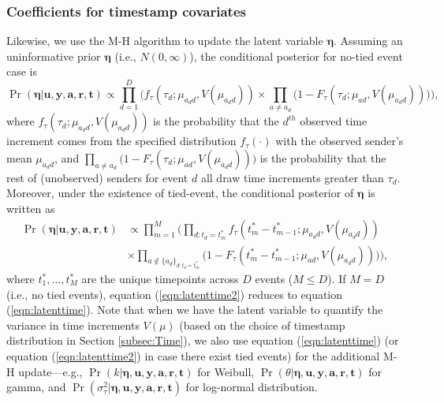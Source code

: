 \documentclass[ba]{imsart}
\numberwithin{equation}{section}
\theoremstyle{plain}
\begin{document}
\subsubsection{Coefficients for timestamp covariates}
Likewise, we use the M-H algorithm to update the latent variable $\boldsymbol{\eta}$. Assuming an uninformative prior $\boldsymbol{\eta}$ (i.e., $N({0},\infty)$), the conditional posterior for no-tied event case is
\begin{equation}
\Pr(\boldsymbol{\eta}| \boldsymbol{u}, \boldsymbol{y},\boldsymbol{a}, \boldsymbol{r},\boldsymbol{t})\propto \prod_{d=1}^D\Big(f_{\tau}(\tau_{d}; \mu_{a_d d}, V(\mu_{a_d d}))\times \prod_{a\neq a_d}\big(1-F_{\tau}(\tau_{d}; \mu_{a d}, V(\mu_{a_d d})) \big)\Big),
\label{eqn:latenttime}
\end{equation}
where $f_{\tau}(\tau_{d}; \mu_{a_d d}, V(\mu_{a_d d}))$ is the probability that the $d^{th}$ observed time increment comes from the specified distribution $f_\tau(\cdot)$ with the observed sender's mean $\mu_{a_d d}$, and $\prod_{a\neq a_d}\big(1-F_{\tau}(\tau_{d}; \mu_{a d},V(\mu_{a_d d})) \big)$ is the probability that the rest of (unobserved) senders for event $d$ all draw time increments greater than $\tau_d$. Moreover, under the existence of tied-event, the conditional posterior of $\boldsymbol{\eta}$ is written as
\begin{equation}
\begin{aligned}
\Pr(\boldsymbol{\eta}| \boldsymbol{u}, \boldsymbol{y},\boldsymbol{a}, \boldsymbol{r},\boldsymbol{t})&\propto \prod_{m=1}^M\Big(\prod_{d:t_d=t_m^*}f_{\tau}(t_m^*-t_{m-1}^*; \mu_{a_d d}, V(\mu_{a_d d})) \\&\times \prod_{a \notin \{a_d\}_{d:t_d=t_m^*}}\big(1-F_{\tau}(t_m^*-t_{m-1}^*; \mu_{a d}, V(\mu_{a_d d})) \big)\Big),
\end{aligned}
\label{eqn:latenttime2}
\end{equation}
where $t_1^*,\ldots,t_M^*$ are the unique timepoints across $D$ events ($M \leq D$). If $M=D$ (i.e., no tied events), equation (\ref{eqn:latenttime2}) reduces to equation (\ref{eqn:latenttime}). Note that when we have the latent variable to quantify the variance in time increments $V(\mu)$ (based on the choice of timestamp distribution in Section \ref{subsec:Time}), we also use equation (\ref{eqn:latenttime}) (or equation (\ref{eqn:latenttime2}) in case there exist tied events) for the additional M-H update---e.g., $\Pr(k| \boldsymbol{\eta},\boldsymbol{u}, \boldsymbol{y},\boldsymbol{a}, \boldsymbol{r},\boldsymbol{t})$ for Weibull, $\Pr(\theta| \boldsymbol{\eta},\boldsymbol{u}, \boldsymbol{y},\boldsymbol{a}, \boldsymbol{r},\boldsymbol{t})$ for gamma, and  $\Pr(\sigma^2_\tau| \boldsymbol{\eta},\boldsymbol{u}, \boldsymbol{y},\boldsymbol{a}, \boldsymbol{r},\boldsymbol{t})$ for log-normal distribution.
\end{document}
